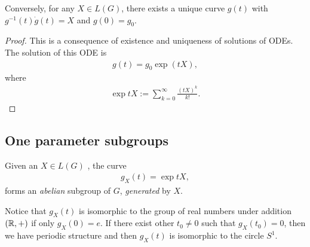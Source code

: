 \begin{claim}
    Conversely, for any $X \in L \left( G \right) $, there exists a unique curve $g \left( t \right) $ with $g^{-1} \left( t \right) \dot{g}\left( t \right) = X$ and $g \left( 0 \right) = g_0$.
\end{claim}
\begin{proof}
    This is a consequence of existence and uniqueness of solutions of ODEs. The solution of this ODE is
    \begin{align}
        g \left( t \right) = g_0 \exp \left( tX \right) 
    ,\end{align}
    where
    \begin{align}
        \exp t X := \sum_{k=0}^{\infty} \frac{\left( t X \right)^{k}}{k!} 
    .\end{align}
\end{proof}

\subsection{One parameter subgroups}

Given an $X \in L \left( G \right) $ , the curve
\begin{align}
    g_X \left( t \right) = \exp t X
,\end{align}
forms an \textit{abelian} subgroup of $G$, \textit{generated} by $X$.

Notice that $g_X \left( t \right) $ is isomorphic to the group of real numbers under addition $\left( \mathbb{R}, + \right) $ if only $g_X \left( 0 \right) = e$. If there exist other $t_0 \neq 0$ such that $g_X\left( t_0 \right) = 0 $, then we have periodic structure and then $g_X \left( t \right) $ is isomorphic to the circle $S^{1}$.





